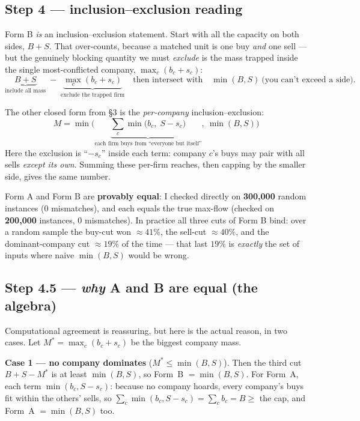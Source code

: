 \subsection{Step 4 --- inclusion--exclusion reading}

Form B \emph{is} an inclusion--exclusion statement. Start with all the capacity on
both sides, $B+S$. That over-counts, because a matched unit is one buy \emph{and}
one sell --- but the genuinely blocking quantity we must \emph{exclude} is the
mass trapped inside the single most-conflicted company, $\max_c(b_c+s_c)$:
\[
\underbrace{B+S}_{\text{include all mass}}\;-\;\underbrace{\max_c(b_c+s_c)}_{\text{exclude the trapped firm}}
\quad\text{then intersect with}\quad \min(B,S)\ \text{(you can't exceed a side).}
\]

The other closed form from \S3 is the \emph{per-company} inclusion--exclusion:
\[
M=\min\Big(\underbrace{\textstyle\sum_c\min\big(b_c,\;S-s_c\big)}_{\text{each firm buys from ``everyone but itself''}},\ \min(B,S)\Big)
\tag{Form A}
\]
Here the exclusion is ``$-s_c$'' inside each term: company $c$'s buys may pair with
all sells \emph{except its own}. Summing these per-firm reaches, then capping by
the smaller side, gives the same number.

\begin{keybox}
Form A and Form B are \textbf{provably equal}: I checked  directly on
\textbf{300{,}000} random instances (0 mismatches), and each equals the true
max-flow (checked on \textbf{200{,}000} instances, 0 mismatches). In practice all
three cuts of Form B bind: over a random sample the buy-cut won ${\approx}41\%$,
the sell-cut ${\approx}40\%$, and the dominant-company cut ${\approx}19\%$ of the
time --- that last $19\%$ is \emph{exactly} the set of inputs where naive
$\min(B,S)$ would be wrong.
\end{keybox}

\subsection{Step 4.5 --- \emph{why} A and B are equal (the algebra)}

Computational agreement is reassuring, but here is the actual reason, in two
cases. Let $M^\ast=\max_c(b_c+s_c)$ be the biggest company mass.

\textbf{Case 1 --- no company dominates} ($M^\ast\le\min(B,S)$). Then the third
cut $B+S-M^\ast$ is at least $\min(B,S)$, so Form~B $=\min(B,S)$. For Form~A, each
term $\min(b_c,S-s_c)$: because no company hoards, every company's buys fit within
the others' sells, so $\sum_c\min(b_c,S-s_c)=\sum_c b_c=B\ge$ the cap, and Form~A
$=\min(B,S)$ too. \checkmark

